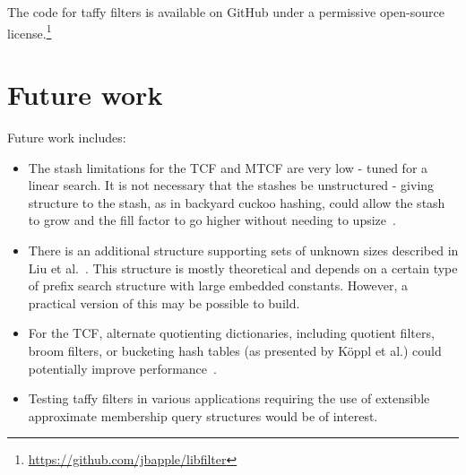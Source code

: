 \documentclass[letterpaper,twocolumn,10pt]{article}
\newcommand{\etal}{et al.}
\begin{document}
The code for taffy filters is available on GitHub under a permissive open-source license.\ifanon\else\footnote{\url{https://github.com/jbapple/libfilter}}\fi









\section{Future work}
\label{conclusion}

Future work includes:

\begin{itemize}
\item The stash limitations for the TCF and MTCF are very low - tuned for a linear search.
It is not necessary that the stashes be unstructured - giving structure to the stash, as in backyard cuckoo hashing, could allow the stash to grow and the fill factor to go higher without needing to upsize~\cite{backyard}.

\item There is an additional structure supporting sets of unknown sizes described in Liu \etal~\cite{unknown-prefix}.
This structure is mostly theoretical and depends on a certain type of prefix search structure with large embedded constants.
However, a practical version of this may be possible to build.

\item For the TCF, alternate quotienting dictionaries, including quotient filters, broom filters, or bucketing hash tables (as presented by K\"oppl \etal{}) could potentially improve performance~\cite{raman-practical,broom,quotient-filter}.

\item Testing taffy filters in various applications requiring the use of extensible approximate membership query structures would be of interest.
\end{itemize}
\end{document}
